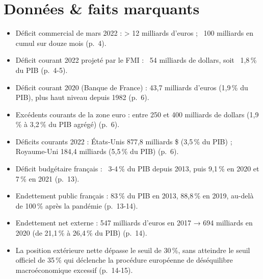 \documentclass[11pt,a4paper]{article}
\begin{document}
\section{Données \& faits marquants}
\begin{itemize}
  \item Déficit commercial de mars 2022 : > 12 milliards d'euros ; ~100 milliards
  en cumul sur douze mois (p.~4).
  \item Déficit courant 2022 projeté par le FMI : ~54 milliards de dollars, soit
  ~1,8\,\% du PIB (p.~4-5).
  \item Déficit courant 2020 (Banque de France) : 43,7 milliards d'euros (1,9\,\% du
  PIB), plus haut niveau depuis 1982 (p.~6).
  \item Excédents courants de la zone euro : entre 250 et 400 milliards de dollars
  (1,9\,\% à 3,2\,\% du PIB agrégé) (p.~6).
  \item Déficits courants 2022 : États-Unis 877,8 milliards \$ (3,5\,\% du PIB) ;
  Royaume-Uni 184,4 milliards (5,5\,\% du PIB) (p.~6).
  \item Déficit budgétaire français : ~3-4\,\% du PIB depuis 2013, puis 9,1\,\% en
  2020 et 7\,\% en 2021 (p.~13).
  \item Endettement public français : 83\,\% du PIB en 2013, 88,8\,\% en 2019,
  au-delà de 100\,\% après la pandémie (p.~13-14).
  \item Endettement net externe : 547 milliards d'euros en 2017 → 694 milliards en
  2020 (de 21,1\,\% à 26,4\,\% du PIB) (p.~14).
  \item La position extérieure nette dépasse le seuil de 30\,\%, sans atteindre le
  seuil officiel de 35\,\% qui déclenche la procédure européenne de déséquilibre
  macroéconomique excessif (p.~14-15).
\end{itemize}
\end{document}

